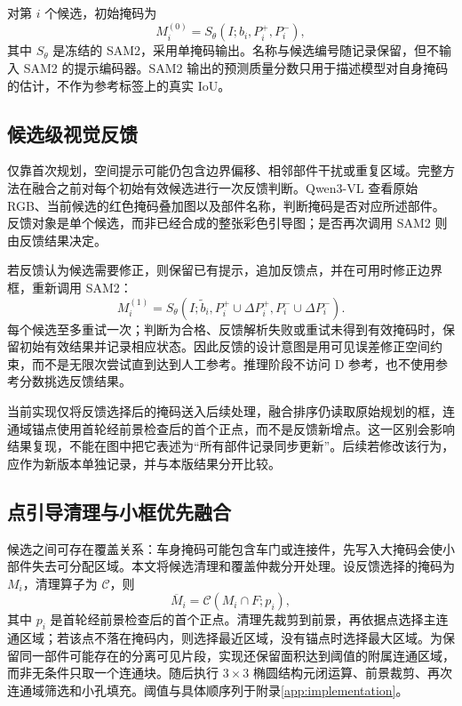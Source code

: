 对第 $i$ 个候选，初始掩码为
\begin{equation}
 M_i^{(0)}=S_{\theta}(I;b_i,P_i^+,P_i^-),
 \label{eq:sam}
\end{equation}
其中 $S_{\theta}$ 是冻结的 SAM2，采用单掩码输出。名称与候选编号随记录保留，但不输入 SAM2 的提示编码器。SAM2 输出的预测质量分数只用于描述模型对自身掩码的估计，不作为参考标签上的真实 IoU。



\subsection{候选级视觉反馈}
仅靠首次规划，空间提示可能仍包含边界偏移、相邻部件干扰或重复区域。完整方法在融合之前对每个初始有效候选进行一次反馈判断。Qwen3-VL 查看原始 RGB、当前候选的红色掩码叠加图以及部件名称，判断掩码是否对应所述部件。反馈对象是单个候选，而非已经合成的整张彩色引导图；是否再次调用 SAM2 则由反馈结果决定。

若反馈认为候选需要修正，则保留已有提示，追加反馈点，并在可用时修正边界框，重新调用 SAM2：
\begin{equation}
 M_i^{(1)}=S_{\theta}(I;\widetilde b_i,
              P_i^+\cup\Delta P_i^+,P_i^-\cup\Delta P_i^-).
 \label{eq:feedback}
\end{equation}
每个候选至多重试一次；判断为合格、反馈解析失败或重试未得到有效掩码时，保留初始有效结果并记录相应状态。因此反馈的设计意图是用可见误差修正空间约束，而不是无限次尝试直到达到人工参考。推理阶段不访问 D 参考，也不使用参考分数挑选反馈结果。

当前实现仅将反馈选择后的掩码送入后续处理，融合排序仍读取原始规划的框，连通域锚点使用首轮经前景检查后的首个正点，而不是反馈新增点。这一区别会影响结果复现，不能在图中把它表述为“所有部件记录同步更新”。后续若修改该行为，应作为新版本单独记录，并与本版结果分开比较。

\subsection{点引导清理与小框优先融合}
候选之间可存在覆盖关系：车身掩码可能包含车门或连接件，先写入大掩码会使小部件失去可分配区域。本文将候选清理和覆盖仲裁分开处理。设反馈选择的掩码为 $M_i$，清理算子为 $\mathcal{C}$，则
\begin{equation}
 \overline M_i=\mathcal{C}(M_i\cap F;p_i),
 \label{eq:clean}
\end{equation}
其中 $p_i$ 是首轮经前景检查后的首个正点。清理先裁剪到前景，再依据点选择主连通区域；若该点不落在掩码内，则选择最近区域，没有锚点时选择最大区域。为保留同一部件可能存在的分离可见片段，实现还保留面积达到阈值的附属连通区域，而非无条件只取一个连通块。随后执行 $3\times3$ 椭圆结构元闭运算、前景裁剪、再次连通域筛选和小孔填充。阈值与具体顺序列于附录\ref{app:implementation}。

